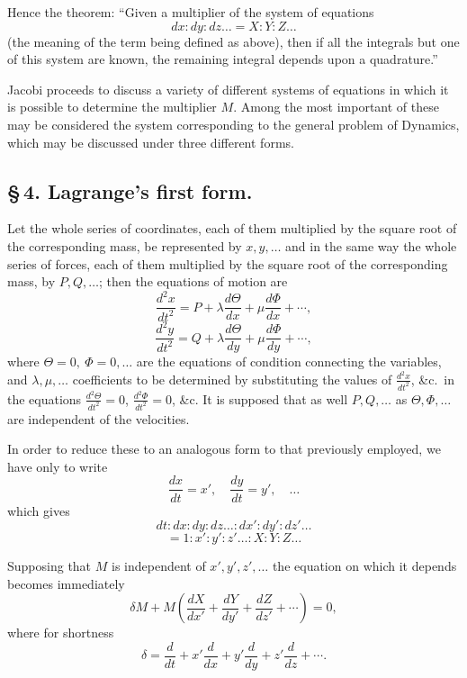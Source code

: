 \documentclass[12pt,a4paper]{article}
\begin{document}
Hence the theorem: ``Given a multiplier of the system of equations
\[
dx : dy : dz \ldots = X : Y : Z \ldots
\]
(the meaning of the term being defined as above), then if all the integrals but one of this system are known, the remaining integral depends upon a quadrature.''

Jacobi proceeds to discuss a variety of different systems of equations in which it is possible to determine the multiplier $M$. Among the most important of these may be considered the system corresponding to the general problem of Dynamics, which may be discussed under three different forms.

\subsection*{\S\,4. Lagrange's first form\footnotemark.}

Let the whole series of coordinates, each of them multiplied by the square root of the corresponding mass, be represented by $x, y, \ldots$ and in the same way the whole series of forces, each of them multiplied by the square root of the corresponding mass, by $P, Q, \ldots$; then the equations of motion are
\[
\frac{d^2 x}{dt^2} = P + \lambda\frac{d\Theta}{dx} + \mu\frac{d\Phi}{dx} + \cdots,
\]
\[
\frac{d^2 y}{dt^2} = Q + \lambda\frac{d\Theta}{dy} + \mu\frac{d\Phi}{dy} + \cdots,
\]
where $\Theta = 0,\ \Phi = 0,\ldots$ are the equations of condition connecting the variables, and $\lambda, \mu,\ldots$ coefficients to be determined by substituting the values of $\frac{d^2x}{dt^2}$, \&c.\ in the equations $\frac{d^2\Theta}{dt^2}=0$, $\frac{d^2\Phi}{dt^2}=0$, \&c. It is supposed that as well $P, Q,\ldots$ as $\Theta, \Phi,\ldots$ are independent of the velocities.

In order to reduce these to an analogous form to that previously employed, we have only to write
\[
\frac{dx}{dt} = x',\quad \frac{dy}{dt} = y',\quad \ldots
\]
which gives
\[
dt : dx : dy : dz \ldots : dx' : dy' : dz' \ldots
\]
\[
= 1 : x' : y' : z' \ldots : X : Y : Z \ldots
\]

Supposing that $M$ is independent of $x', y', z',\ldots$ the equation on which it depends becomes immediately
\[
\delta M + M\left(\frac{dX}{dx'} + \frac{dY}{dy'} + \frac{dZ}{dz'} + \cdots\right) = 0,
\]
where for shortness
\[
\delta = \frac{d}{dt} + x'\frac{d}{dx} + y'\frac{d}{dy} + z'\frac{d}{dz} + \cdots.
\]
\end{document}
